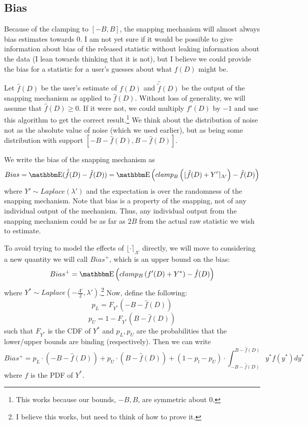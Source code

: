 \documentclass[11pt]{scrartcl} %
\begin{document}
\subsection{Bias}
\label{subsec:bias}
Because of the clamping to $[-B,B]$, the snapping mechanism will almost always bias estimates towards $0$.
I am not yet sure if it would be possible to give information about bias of the released statistic without leaking information
about the data (I lean towards thinking that it is not), but I believe we could provide the bias for a statistic for
a user's guesses about what $f(D)$ might be. \newline

Let $\hat{f}(D)$ be the user's estimate of $f(D)$ and $\hat{\tilde{f}}(D)$ be the output of the snapping mechanism as applied to
$\hat{f}(D)$. Without loss of generality, we will assume that $\hat{f}(D) \geq 0$. If it were not, we could
multiply $f'(D)$ by $-1$ and use this algorithm to get the correct result.\footnote{This works because our bounds, $-B, B$, are symmetric about $0$.}
We think about the distribution of noise not as the absolute value of noise (which we used earlier), but as
being some distribution with support $[-B - \hat{f}(D), B - \hat{f}(D)]$. \newline

We write the bias of the snapping mechanism as
\[ Bias = \E(\hat{\tilde{f}}(D) - \hat{f}(D)) = \E\left( clamp_B\left( \lfloor \hat{f}(D) + Y' \rceil_{\Lambda'} \right) - \hat{f}(D) \right) \]
where $Y' \sim Laplace(\lambda')$ and the expectation is over the randomness of the snapping mechanism.
Note that bias is a property of the snapping, not of any individual output of the mechanism.
Thus, any individual output from the snapping mechanism could be as far as $2B$ from the actual raw statistic
we wish to estimate. \newline

To avoid trying to model the effects of $\lfloor \cdot \rceil_{\Lambda'}$ directly, we will move to considering
a new quantity we will call $Bias^{+}$, which is an upper bound on the bias:
\[ Bias^{+} = \E\left( clamp_B\left( f'(D) + Y^{*} \right) - \hat{f}(D) \right) \]
where $Y^{*} \sim Laplace(-\frac{\Lambda'}{2}, \lambda')$.\footnote{I believe this works,
but need to think of how to prove it.} Now, define the following:
\[ p_L = F_{Y^*}(-B - \hat{f}(D)) \]
\[ p_U = 1 - F_{Y^*}(B - \hat{f}(D)) \]
such that $F_{Y^*}$ is the CDF of $Y^*$ and $p_L, p_U$ are the probabilities that the lower/upper bounds are binding (respectively).
Then we can write
\[ Bias^+ = p_L \cdot (-B - \hat{f}(D)) + p_U \cdot (B - \hat{f}(D)) + (1-p_l-p_U) \cdot \int_{-B-\hat{f}(D)}^{B-\hat{f}(D)}y^* f(y^*) dy^* \]
where $f$ is the PDF of $Y^*$. \newline
\end{document}
